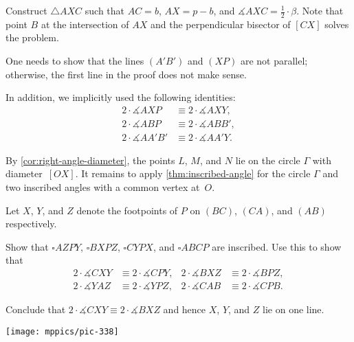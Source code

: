 Construct $\triangle AXC$ such that $AC=b$, $AX=p-b$, and $\measuredangle AXC=\tfrac12\cdot \beta$.
Note that point $B$ at the intersection of $AX$ and the perpendicular bisector of $[CX]$ solves the problem. 


One needs to show that the lines $(A'B')$ and $(XP)$ are not parallel; otherwise, the first line in the proof does not make sense.



In addition, we implicitly used the following identities:
\begin{align*}
2\cdot \measuredangle AXP&\equiv2\cdot \measuredangle AXY,
\\
2\cdot \measuredangle ABP&\equiv2\cdot \measuredangle ABB',
\\
2\cdot \measuredangle AA'B'&\equiv2\cdot \measuredangle AA'Y.
\end{align*}

By \ref{cor:right-angle-diameter},
the points $L$, $M$, and $N$ lie on the circle $\Gamma$ with diameter~$[OX]$.
It remains to apply \ref{thm:inscribed-angle} for the circle $\Gamma$ 
and two inscribed angles with a common vertex at~$O$.

Let $X$, $Y$, and $Z$ denote the footpoints of $P$ on $(BC)$, $(CA)$, and $(AB)$ respectively.

Show that $\square AZPY$, $\square BXPZ$, $\square CYPX$, and $\square ABCP$ are inscribed.
Use this to show that
\begin{align*}
2\cdot \measuredangle CXY&\equiv 2\cdot \measuredangle CPY,
&
2\cdot \measuredangle BXZ&\equiv 2\cdot \measuredangle BPZ,
\\
2\cdot \measuredangle YAZ&\equiv 2\cdot \measuredangle YPZ,
&
2\cdot \measuredangle CAB&\equiv 2\cdot \measuredangle CPB.
\end{align*}

Conclude that 
$2\cdot \measuredangle CXY\equiv 2\cdot \measuredangle BXZ$
and hence $X$, $Y$, and $Z$ lie on one line.

\begin{Figure}
\centering
\texttt{[image: mppics/pic-338]}
\end{Figure}



